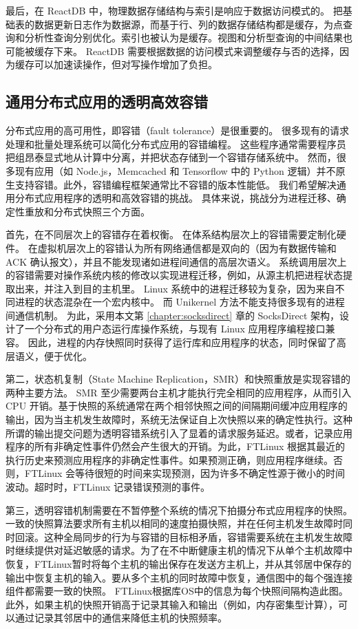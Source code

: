 最后，在 ReactDB 中，物理数据存储结构与索引是响应于数据访问模式的。
把基础表的数据更新日志作为数据源，而基于行、列的数据存储结构都是缓存，为点查询和分析性查询分别优化。索引也被认为是缓存。视图和分析型查询的中间结果也可能被缓存下来。
ReactDB 需要根据数据的访问模式来调整缓存与否的选择，因为缓存可以加速读操作，但对写操作增加了负担。

\subsection{通用分布式应用的透明高效容错}

分布式应用的高可用性，即容错（fault tolerance）是很重要的。
很多现有的请求处理和批量处理系统可以简化分布式应用的容错编程。
这些程序通常需要程序员把组昂泰显式地从计算中分离，并把状态存储到一个容错存储系统中。
然而，很多现有应用（如 Node.js，Memcached 和 Tensorflow 中的 Python 逻辑）并不原生支持容错。此外，容错编程框架通常比不容错的版本性能低。
我们希望解决通用分布式应用程序的透明和高效容错的挑战。
具体来说，挑战分为进程迁移、确定性重放和分布式快照三个方面。

首先，在不同层次上的容错存在着权衡。
在体系结构层次上的容错需要定制化硬件。
在虚拟机层次上的容错认为所有网络通信都是双向的（因为有数据传输和 ACK 确认报文），并且不能发现诸如进程间通信的高层次语义。
系统调用层次上的容错需要对操作系统内核的修改以实现进程迁移，例如，从源主机把进程状态提取出来，并注入到目的主机里。
Linux 系统中的进程迁移较为复杂，因为来自不同进程的状态混杂在一个宏内核中。
而 Unikernel 方法不能支持很多现有的进程间通信机制。
为此，采用本文第 \ref{chapter:socksdirect} 章的 SocksDirect 架构，设计了一个分布式的用户态运行库操作系统，与现有 Linux 应用程序编程接口兼容。
因此，进程的内存快照同时获得了运行库和应用程序的状态，同时保留了高层语义，便于优化。

第二，状态机复制（State Machine Replication，SMR）和快照重放是实现容错的两种主要方法。 SMR 至少需要两台主机才能执行完全相同的应用程序，从而引入 CPU 开销。基于快照的系统通常在两个相邻快照之间的间隔期间缓冲应用程序的输出，因为当主机发生故障时，系统无法保证自上次快照以来的确定性执行。这种所谓的输出提交问题为透明容错系统引入了显着的请求服务延迟。或者，记录应用程序的所有非确定性事件仍然会产生很大的开销。为此，FTLinux 根据其最近的执行历史来预测应用程序的非确定性事件。如果预测正确，则应用程序继续。否则，FTLinux 会等待很短的时间来实现预测，因为许多不确定性源于微小的时间波动。超时时，FTLinux 记录错误预测的事件。

第三，透明容错机制需要在不暂停整个系统的情况下拍摄分布式应用程序的快照。一致的快照算法要求所有主机以相同的速度拍摄快照，并在任何主机发生故障时同时回滚。这种全局同步的行为与容错的目标相矛盾，容错需要系统在主机发生故障时继续提供对延迟敏感的请求。为了在不中断健康主机的情况下从单个主机故障中恢复，FTLinux暂时将每个主机的输出保存在发送方主机上，并从其邻居中保存的输出中恢复主机的输入。要从多个主机的同时故障中恢复，通信图中的每个强连接组件都需要一致的快照。 FTLinux根据库OS中的信息为每个快照间隔构造此图。此外，如果主机的快照开销高于记录其输入和输出（例如，内存密集型计算），可以通过记录其邻居中的通信来降低主机的快照频率。

